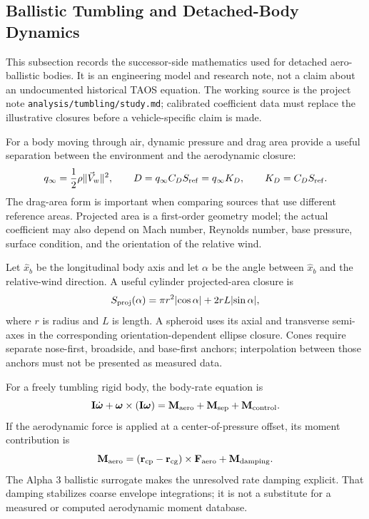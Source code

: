 \subsection{Ballistic Tumbling and Detached-Body Dynamics}\label{sec:ballistic-tumbling}

This subsection records the successor-side mathematics used for detached
aero-ballistic bodies. It is an engineering model and research note, not a
claim about an undocumented historical TAOS equation. The working source is
the project note \texttt{analysis/tumbling/study.md}; calibrated coefficient
data must replace the illustrative closures before a vehicle-specific claim is
made.

For a body moving through air, dynamic pressure and drag area provide a useful
separation between the environment and the aerodynamic closure:
\[
  q_\infty=\frac{1}{2}\rho\lVert\vec V_{w}\rVert^2,
  \qquad
  D=q_\infty C_D S_{\rm ref}=q_\infty K_D,
  \qquad
  K_D=C_D S_{\rm ref}.
\]
The drag-area form is important when comparing sources that use different
reference areas. Projected area is a first-order geometry model; the actual
coefficient may also depend on Mach number, Reynolds number, base pressure,
surface condition, and the orientation of the relative wind.

Let $\hat x_b$ be the longitudinal body axis and let $\alpha$ be the angle
between $\hat x_b$ and the relative-wind direction. A useful cylinder
projected-area closure is
\[
  S_{\rm proj}(\alpha)
  =\pi r^2\lvert\cos\alpha\rvert
   +2rL\lvert\sin\alpha\rvert,
\]
where $r$ is radius and $L$ is length. A spheroid uses its axial and
transverse semi-axes in the corresponding orientation-dependent ellipse
closure. Cones require separate nose-first, broadside, and base-first anchors;
interpolation between those anchors must not be presented as measured data.

For a freely tumbling rigid body, the body-rate equation is
\[
  \mathbf I\dot{\boldsymbol\omega}
  +\boldsymbol\omega\times
    (\mathbf I\boldsymbol\omega)
  =\mathbf M_{\rm aero}+\mathbf M_{\rm sep}+\mathbf M_{\rm control}.
\]
If the aerodynamic force is applied at a center-of-pressure offset, its
moment contribution is
\[
  \mathbf M_{\rm aero}
  =(\mathbf r_{\rm cp}-\mathbf r_{\rm cg})
    \times\mathbf F_{\rm aero}
  +\mathbf M_{\rm damping}.
\]
The Alpha 3 ballistic surrogate makes the unresolved rate damping explicit.
That damping stabilizes coarse envelope integrations; it is not a substitute
for a measured or computed aerodynamic moment database.

